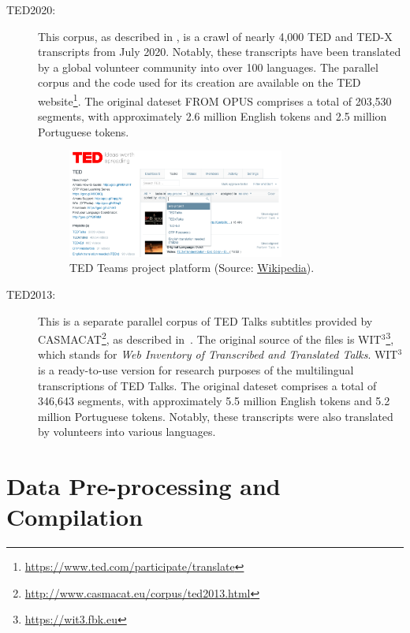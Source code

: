 \begin{description}
    \item[TED2020:] This corpus, as described in \textcite{reimers-2020-multilingual-sentence-bert}, is a crawl of nearly 4,000 TED and TED-X transcripts from July 2020. Notably, these transcripts have been translated by a global volunteer community into over 100 languages. The parallel corpus and the code used for its creation are available on the TED website\footnote{\href{https://www.ted.com/participate/translate}{https://www.ted.com/participate/translate}}. The original dateset FROM OPUS comprises a total of 203,530 segments, with approximately 2.6 million English tokens and 2.5 million Portuguese tokens.
 
        \begin{figure}[htb]
        \centering
        \includegraphics[width=0.7\textwidth]{textual/Figuras/TEDteamprojects.png}
        \caption{TED Teams project platform (Source: \href{https://translations.ted.com/How_to_Tackle_a_Review}{Wikipedia}).}
        \label{fig: ted-team-project}
        \end{figure}
        
    \item[TED2013:] This is a separate parallel corpus of TED Talks subtitles provided by CASMACAT\footnote{\href{http://www.casmacat.eu/corpus/ted2013.html}{http://www.casmacat.eu/corpus/ted2013.html}}, as described in~\textcite{tiedemann-2012-parallel}. The original source of the files is WIT$^3$\footnote{\href{https://wit3.fbk.eu}{https://wit3.fbk.eu}}, which stands for \emph{Web Inventory of Transcribed and Translated Talks}. WIT$^3$ is a ready-to-use version for research purposes of the multilingual transcriptions of TED Talks. The original dateset comprises a total of 346,643 segments, with approximately 5.5 million English tokens and 5.2 million Portuguese tokens. Notably, these transcripts were also translated by volunteers into various languages.
\end{description}


\section{Data Pre-processing and Compilation}

